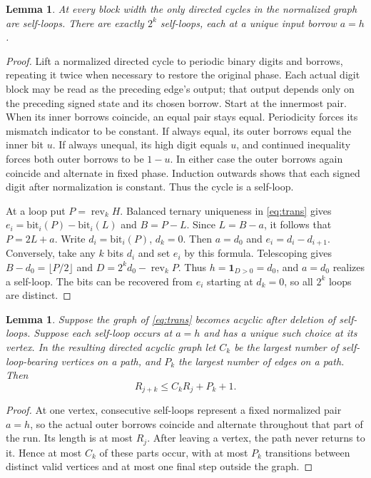\documentclass[11pt]{article}
\newtheorem{lemma}[theorem]{Lemma}
\newcommand{\rev}{\operatorname{rev}}
\begin{document}
\begin{lemma}
At every block width the only directed cycles in the normalized graph are self-loops. There are exactly $2^k$ self-loops, each at a unique input borrow $a=h$.
\end{lemma}
\begin{proof}
Lift a normalized directed cycle to periodic binary digits and borrows, repeating it twice when necessary to restore the original phase. Each actual digit block may be read as the preceding edge's output; that output depends only on the preceding signed state and its chosen borrow. Start at the innermost pair. When its inner borrows coincide, an equal pair stays equal. Periodicity forces its mismatch indicator to be constant. If always equal, its outer borrows equal the inner bit $u$. If always unequal, its high digit equals $u$, and continued inequality forces both outer borrows to be $1-u$. In either case the outer borrows again coincide and alternate in fixed phase. Induction outwards shows that each signed digit after normalization is constant. Thus the cycle is a self-loop.

At a loop put $P=\rev_k H$. Balanced ternary uniqueness in \eqref{eq:trans} gives $e_i=\mathrm{bit}_i(P)-\mathrm{bit}_i(L)$ and $B=P-L$. Since $L=B-a$, it follows that $P=2L+a$. Write $d_i=\mathrm{bit}_i(P)$, $d_k=0$. Then $a=d_0$ and $e_i=d_i-d_{i+1}$. Conversely, take any $k$ bits $d_i$ and set $e_i$ by this formula. Telescoping gives $B-d_0=\lfloor P/2\rfloor$ and $D=2^k d_0-\rev_k P$. Thus $h=\mathbf 1_{D>0}=d_0$, and $a=d_0$ realizes a self-loop. The bits can be recovered from $e_i$ starting at $d_k=0$, so all $2^k$ loops are distinct.
\end{proof}

\begin{lemma}\label{lem:finite}
Suppose the graph of \eqref{eq:trans} becomes acyclic after deletion of self-loops. Suppose each self-loop occurs at $a=h$ and has a unique such choice at its vertex. In the resulting directed acyclic graph let $C_k$ be the largest number of self-loop-bearing vertices on a path, and $P_k$ the largest number of edges on a path. Then
\[
 R_{j+k}\le C_kR_j+P_k+1.
\]
\end{lemma}
\begin{proof}
At one vertex, consecutive self-loops represent a fixed normalized pair $a=h$, so the actual outer borrows coincide and alternate throughout that part of the run. Its length is at most $R_j$. After leaving a vertex, the path never returns to it. Hence at most $C_k$ of these parts occur, with at most $P_k$ transitions between distinct valid vertices and at most one final step outside the graph.\end{proof}
\end{document}
